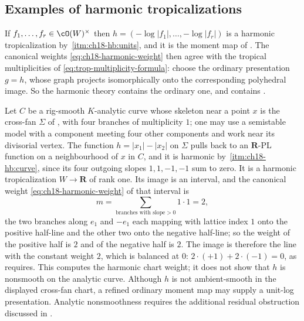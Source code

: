 \subsection{Examples of harmonic tropicalizations}
\label{sec:ch18-harmonic-examples}

\begin{example}
\label{ex:ch18-harmonic-ordinary}
If $f_1,\ldots,f_r\in\cO(W)^\times$ then
$h=(-\log|f_1|,\ldots,-\log|f_r|)$ is a harmonic tropicalization by
\,\cref{itm:ch18-hb:units}, and it is the
moment map of .  The canonical weights
\eqref{eq:ch18-harmonic-weight} then agree with the tropical multiplicities
of \eqref{eq:trop-multiplicity-formula}: choose the ordinary
presentation $g=h$, whose graph projects isomorphically onto the
corresponding polyhedral image.  So the
harmonic theory contains the ordinary one, and
 contains
.
\end{example}

\begin{example}
\label{ex:ch18-cross-chart}
Let $C$ be a rig-smooth $K$-analytic curve whose skeleton near a point $x$
is the cross-fan $\Sigma$ of , with four
branches of multiplicity $1$; one may use a semistable model with a component meeting four other
components and work near its divisorial vertex.  The function $h=|x_1|-|x_2|$ on $\Sigma$ pulls back to
an $\mathbf R$-PL function on a neighbourhood of $x$ in $C$, and it is
harmonic by
\,\cref{itm:ch18-hb:curve}, since its four
outgoing slopes $1,1,-1,-1$ sum to zero.  It is a harmonic tropicalization
$W\to\mathbf R$ of rank one.  Its image is an interval, and the canonical
weight \eqref{eq:ch18-harmonic-weight} of that interval is
\[
 m=\sum_{\text{branches with slope}>0}1\cdot1=2 ,
\]
the two branches along $e_1$ and $-e_1$ each mapping with lattice index $1$
onto the positive half-line and the other two onto the negative half-line;
so the weight of the positive half is $2$ and of the negative half is $2$.
The image is therefore the line with the constant weight $2$, which is
balanced at $0$: $2\cdot(+1)+2\cdot(-1)=0$, as
 requires.  This computes the harmonic chart
weight; it does not show that $h$ is nonsmooth on the analytic curve.
Although $h$ is not ambient-smooth in the displayed cross-fan chart, a
refined ordinary moment map may supply a unit-log presentation.  Analytic
nonsmoothness requires the additional residual obstruction discussed in
\cite[Remark~15.10]{GJR26}.
\end{example}

